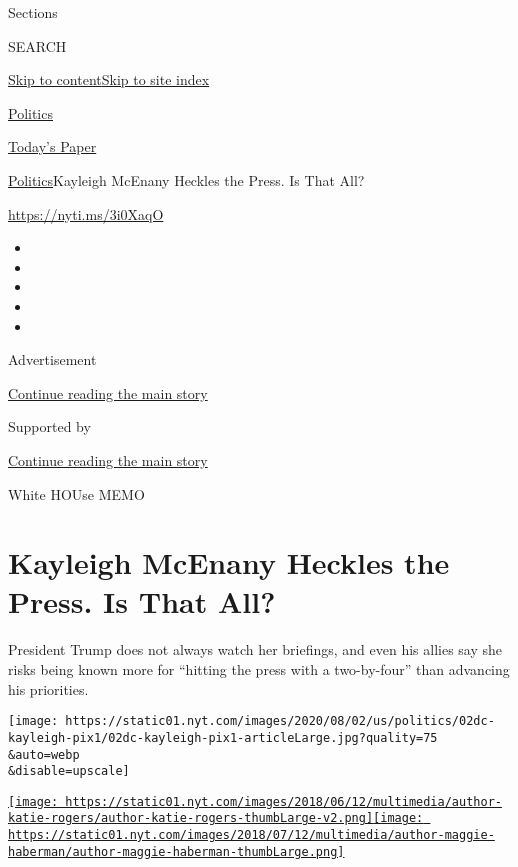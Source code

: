 Sections

SEARCH

\protect\hyperlink{site-content}{Skip to
content}\protect\hyperlink{site-index}{Skip to site index}

\href{https://www.nytimes.com/section/politics}{Politics}

\href{https://myaccount.nytimes.com/auth/login?response_type=cookie\&client_id=vi}{}

\href{https://www.nytimes.com/section/todayspaper}{Today's Paper}

\href{/section/politics}{Politics}\textbar{}Kayleigh McEnany Heckles the
Press. Is That All?

\url{https://nyti.ms/3i0XaqO}

\begin{itemize}
\item
\item
\item
\item
\item
\end{itemize}

Advertisement

\protect\hyperlink{after-top}{Continue reading the main story}

Supported by

\protect\hyperlink{after-sponsor}{Continue reading the main story}

White HOUse MEMO

\hypertarget{kayleigh-mcenany-heckles-the-press-is-that-all}{%
\section{Kayleigh McEnany Heckles the Press. Is That
All?}\label{kayleigh-mcenany-heckles-the-press-is-that-all}}

President Trump does not always watch her briefings, and even his allies
say she risks being known more for ``hitting the press with a
two-by-four'' than advancing his priorities.

\texttt{[image: https://static01.nyt.com/images/2020/08/02/us/politics/02dc-kayleigh-pix1/02dc-kayleigh-pix1-articleLarge.jpg?quality=75\\\&auto=webp\\\&disable=upscale]}

\href{https://www.nytimes.com/by/katie-rogers}{\texttt{[image: https://static01.nyt.com/images/2018/06/12/multimedia/author-katie-rogers/author-katie-rogers-thumbLarge-v2.png]}}\href{https://www.nytimes.com/by/maggie-haberman}{\texttt{[image: https://static01.nyt.com/images/2018/07/12/multimedia/author-maggie-haberman/author-maggie-haberman-thumbLarge.png]}}

